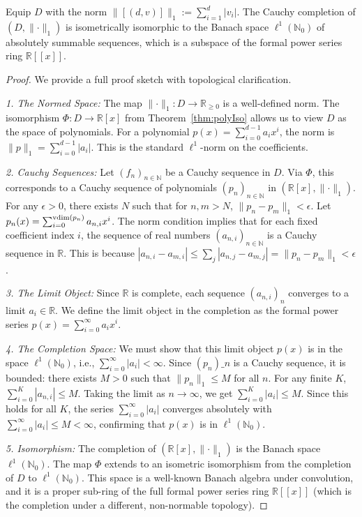 \begin{theorem}[Completion]\label{thm:completion}
Equip \(D\) with the norm \(\lVert[(d,v)]\rVert_1:=\sum_{i=1}^{d}|v_i|\). The Cauchy completion of \((D, \lVert \cdot \rVert_1)\) is isometrically isomorphic to the Banach space \(\ell^1(\mathbb{N}_0)\) of absolutely summable sequences, which is a subspace of the formal power series ring \(\mathbb R[[x]]\).
\end{theorem}
\begin{proof}
We provide a full proof sketch with topological clarification.

\textit{1. The Normed Space:}
The map \(\lVert \cdot \rVert_1: D \to \mathbb{R}_{\ge 0}\) is a well-defined norm. The isomorphism \(\Phi: D \to \mathbb{R}[x]\) from Theorem~\ref{thm:polyIso} allows us to view \(D\) as the space of polynomials. For a polynomial \(p(x) = \sum_{i=0}^{d-1} a_i x^i\), the norm is \(\lVert p \rVert_1 = \sum_{i=0}^{d-1} |a_i|\). This is the standard \(\ell^1\)-norm on the coefficients.

\textit{2. Cauchy Sequences:}
Let \((f_n)_{n \in \mathbb{N}}\) be a Cauchy sequence in \(D\). Via \(\Phi\), this corresponds to a Cauchy sequence of polynomials \((p_n)_{n \in \mathbb{N}}\) in \((\mathbb{R}[x], \lVert \cdot \rVert_1)\). For any \(\epsilon > 0\), there exists \(N\) such that for \(n,m > N\), \(\lVert p_n - p_m \rVert_1 < \epsilon\).
Let \(p_n(x) = \sum_{i=0}^{\operatorname{vdim}(p_n)} a_{n,i} x^i\). The norm condition implies that for each fixed coefficient index \(i\), the sequence of real numbers \((a_{n,i})_{n \in \mathbb{N}}\) is a Cauchy sequence in \(\mathbb{R}\). This is because \(|a_{n,i} - a_{m,i}| \le \sum_j |a_{n,j} - a_{m,j}| = \lVert p_n - p_m \rVert_1 < \epsilon\).

\textit{3. The Limit Object:}
Since \(\mathbb{R}\) is complete, each sequence \((a_{n,i})_n\) converges to a limit \(a_i \in \mathbb{R}\). We define the limit object in the completion as the formal power series \(p(x) = \sum_{i=0}^{\infty} a_i x^i\).

\textit{4. The Completion Space:}
We must show that this limit object \(p(x)\) is in the space \(\ell^1(\mathbb{N}_0)\), i.e., \(\sum_{i=0}^{\infty} |a_i| < \infty\).
Since \((p_n)\_n\) is a Cauchy sequence, it is bounded: there exists \(M > 0\) such that \(\lVert p_n \rVert_1 \le M\) for all \(n\). For any finite \(K\), \(\sum_{i=0}^K |a_{n,i}| \le M\). Taking the limit as \(n \to \infty\), we get \(\sum_{i=0}^K |a_i| \le M\). Since this holds for all \(K\), the series \(\sum_{i=0}^{\infty} |a_i|\) converges absolutely with \(\sum_{i=0}^{\infty} |a_i| \le M < \infty\), confirming that \(p(x)\) is in \(\ell^1(\mathbb{N}_0)\).

\textit{5. Isomorphism:}
The completion of \((\mathbb{R}[x], \lVert \cdot \rVert_1)\) is the Banach space \(\ell^1(\mathbb{N}_0)\). The map \(\Phi\) extends to an isometric isomorphism from the completion of \(D\) to \(\ell^1(\mathbb{N}_0)\). This space is a well-known Banach algebra under convolution, and it is a proper sub-ring of the full formal power series ring \(\mathbb R[[x]]\) (which is the completion under a different, non-normable topology).
\end{proof}
